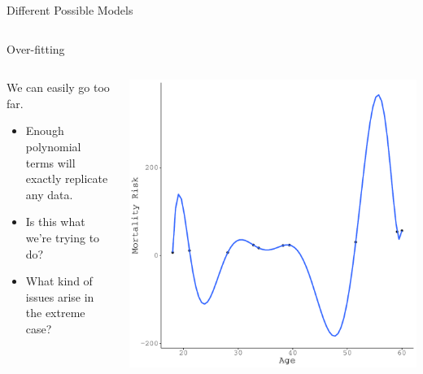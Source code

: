 \documentclass{beamer}\usepackage[]{graphicx}\usepackage[]{color}
\makeatletter
\def\maxwidth{ %
  \ifdim\Gin@nat@width>\linewidth
    \linewidth
  \else
    \Gin@nat@width
  \fi
}
\newenvironment{knitrout}{}{} %
\makeatother
\begin{document}
\begin{frame}{Different Possible Models}
\begin{columns}
\begin{column}{0.5\textwidth}
\begin{knitrout}
{}



\end{knitrout}

\end{column}
\end{columns}

\end{frame} 
  

\begin{frame}{Over-fitting}
  
  \begin{columns}
    \begin{column}{0.5\textwidth}
      
      We can easily go too far.
      \vb
      \begin{itemize}
      \item Enough polynomial terms will exactly replicate any data.  
        \vb
      \item Is this what we're trying to do?  
        \vb
      \item What kind of issues arise in the extreme case?
      \end{itemize}
      
    \end{column}
    
    \begin{column}{0.5\textwidth}
      
\begin{knitrout}\footnotesize
{}\color{fgcolor}

{\centering \includegraphics[width=\maxwidth]{figure/unnamed-chunk-14-1} 

}
\end{knitrout}
\end{column}
\end{columns}
\end{frame}
\end{document}

